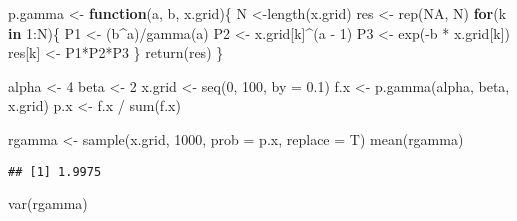 \documentclass[
  spanish,
]{book}
\newenvironment{Shaded}{\begin{snugshade}}{\end{snugshade}}
\newcommand{\AttributeTok}[1]{\textcolor[rgb]{0.77,0.63,0.00}{#1}}
\newcommand{\ConstantTok}[1]{\textcolor[rgb]{0.00,0.00,0.00}{#1}}
\newcommand{\ControlFlowTok}[1]{\textcolor[rgb]{0.13,0.29,0.53}{\textbf{#1}}}
\newcommand{\DecValTok}[1]{\textcolor[rgb]{0.00,0.00,0.81}{#1}}
\newcommand{\FloatTok}[1]{\textcolor[rgb]{0.00,0.00,0.81}{#1}}
\newcommand{\FunctionTok}[1]{\textcolor[rgb]{0.00,0.00,0.00}{#1}}
\newcommand{\NormalTok}[1]{#1}
\newcommand{\OtherTok}[1]{\textcolor[rgb]{0.56,0.35,0.01}{#1}}
\newcommand{\SpecialCharTok}[1]{\textcolor[rgb]{0.00,0.00,0.00}{#1}}
\theoremstyle{definition}
\theoremstyle{definition}
\theoremstyle{definition}
\theoremstyle{definition}
\theoremstyle{remark}
\begin{document}
\begin{Shaded}
\begin{Highlighting}[]
\NormalTok{p.gamma }\OtherTok{\textless{}{-}} \ControlFlowTok{function}\NormalTok{(a, b, x.grid)\{}
\NormalTok{  N }\OtherTok{\textless{}{-}}\FunctionTok{length}\NormalTok{(x.grid)}
\NormalTok{  res }\OtherTok{\textless{}{-}} \FunctionTok{rep}\NormalTok{(}\ConstantTok{NA}\NormalTok{, N)}
  \ControlFlowTok{for}\NormalTok{(k }\ControlFlowTok{in} \DecValTok{1}\SpecialCharTok{:}\NormalTok{N)\{}
\NormalTok{    P1 }\OtherTok{\textless{}{-}}\NormalTok{ (b}\SpecialCharTok{\^{}}\NormalTok{a)}\SpecialCharTok{/}\FunctionTok{gamma}\NormalTok{(a)}
\NormalTok{    P2 }\OtherTok{\textless{}{-}}\NormalTok{ x.grid[k]}\SpecialCharTok{\^{}}\NormalTok{(a }\SpecialCharTok{{-}} \DecValTok{1}\NormalTok{)}
\NormalTok{    P3 }\OtherTok{\textless{}{-}} \FunctionTok{exp}\NormalTok{(}\SpecialCharTok{{-}}\NormalTok{b }\SpecialCharTok{*}\NormalTok{ x.grid[k])}
\NormalTok{    res[k] }\OtherTok{\textless{}{-}}\NormalTok{ P1}\SpecialCharTok{*}\NormalTok{P2}\SpecialCharTok{*}\NormalTok{P3}
\NormalTok{  \}}
  \FunctionTok{return}\NormalTok{(res)}
\NormalTok{\}}

\NormalTok{alpha }\OtherTok{\textless{}{-}} \DecValTok{4}
\NormalTok{beta }\OtherTok{\textless{}{-}} \DecValTok{2}
\NormalTok{x.grid }\OtherTok{\textless{}{-}} \FunctionTok{seq}\NormalTok{(}\DecValTok{0}\NormalTok{, }\DecValTok{100}\NormalTok{, }\AttributeTok{by =} \FloatTok{0.1}\NormalTok{)}
\NormalTok{f.x }\OtherTok{\textless{}{-}} \FunctionTok{p.gamma}\NormalTok{(alpha, beta, x.grid)}
\NormalTok{p.x }\OtherTok{\textless{}{-}}\NormalTok{ f.x }\SpecialCharTok{/} \FunctionTok{sum}\NormalTok{(f.x)}

\NormalTok{rgamma }\OtherTok{\textless{}{-}} \FunctionTok{sample}\NormalTok{(x.grid, }\DecValTok{1000}\NormalTok{, }\AttributeTok{prob =}\NormalTok{ p.x, }\AttributeTok{replace =}\NormalTok{ T)}
\FunctionTok{mean}\NormalTok{(rgamma)}
\end{Highlighting}
\end{Shaded}

\begin{verbatim}
## [1] 1.9975
\end{verbatim}

\begin{Shaded}
\begin{Highlighting}[]
\FunctionTok{var}\NormalTok{(rgamma)}
\end{Highlighting}
\end{Shaded}
\end{document}
